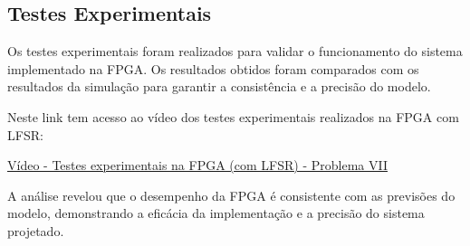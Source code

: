 \subsection{Testes Experimentais}
Os testes experimentais foram realizados para validar o funcionamento do sistema implementado na FPGA. Os resultados obtidos foram comparados com os resultados da simulação para garantir a consistência e a precisão do modelo.

\vspace{1em}

Neste link tem acesso ao vídeo dos testes experimentais realizados na FPGA com LFSR:

\vspace{1em}

\href{https://unlpt-my.sharepoint.com/:v:/g/personal/jafe_lopes_fct_unl_pt/EX9z6gGr7RVHrWoCom8IBLcBAVT6YzrEATOdDugrQtE6oQ?e=KXuH2R}{Vídeo - Testes experimentais na FPGA (com LFSR) - Problema VII}

\vspace{1em}

A análise revelou que o desempenho da FPGA é consistente com as previsões do modelo, demonstrando a eficácia da implementação e a precisão do sistema projetado.